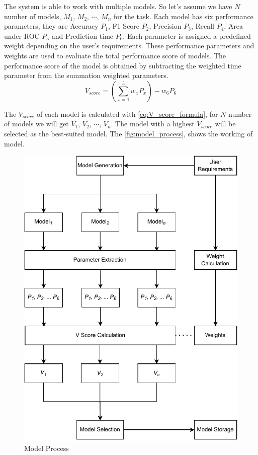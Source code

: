 \documentclass[a4paper,fleqn]{cas-dc}
\begin{document}
The system is able to work with multiple models. So let's assume we have $N$ number of models, $M_1$, $M_2$, $\cdots$, $M_n$ for the task. Each model has six performance parameters, they are Accuracy $P_1$, F1 Score $P_2$, Precision $P_3$, Recall $P_4$, Area under ROC $P_5$ and Prediction time $P_6$. Each parameter is assigned a predefined weight depending on the user's requirements. These performance parameters and weights are used to evaluate the total performance score of models. The performance score of the model is obtained by subtracting the weighted time parameter from the summation weighted parameters.
\begin{equation}\label{eq:V_score_formula}
    V_{score} = \left(\sum_{x=1}^5 w_xP_x\right) - w_6P_6
\end{equation}

The $V_{score}$ of each model is calculated with \autoref{eq:V_score_formula}, for $N$ number of models we will get $V_1$, $V_2$, $\cdots$, $V_n$. The model with a highest $V_{score}$ will be selected as the best-suited model. The \autoref{fig:model_process}, shows the working of model.

\begin{figure}[ht]
    \centering
    \includegraphics[width=1.6\columnwidth]{math_model_relaxed.pdf}
    \caption{Model Process}
    \label{fig:model_process}
\end{figure}
\end{document}
